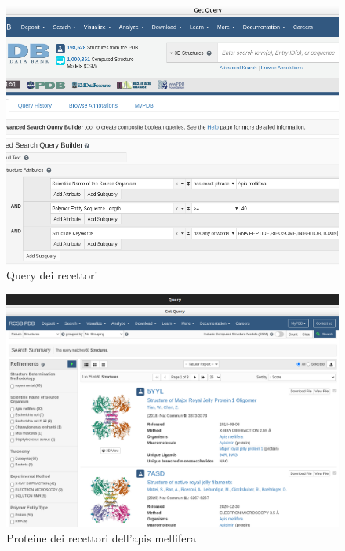 \begin{figure}[H]
    \centering
    \includegraphics[scale=0.57]{immagini/capitolo3/queryRecettori.png}
    \caption{Query dei recettori}
    \label{fig:query recettori}
\end{figure}

\begin{figure}[H]
    \centering
    \includegraphics[scale=0.4]{immagini/capitolo3/fileRecettori.png}
    \caption{Proteine dei recettori dell'apis mellifera}
    \label{fig:file recettori}
\end{figure}

